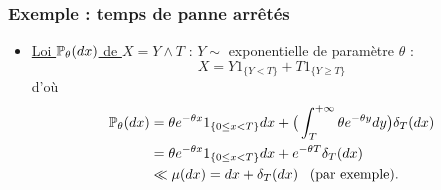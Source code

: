 %
%
%
\begin{frame}
\frametitle{Exemple : temps de panne \og arrêtés\fg{}}
\begin{itemize}
\item \underline{Loi $\operatorname{{\mathbb P}}_\theta(dx)$ de $X = Y \wedge T$} : $Y \sim$ exponentielle de paramètre $\theta$ :
$$\boxed{X = Y 1_{\{Y < T\}} + T 1_{\{Y \geq T\}}}$$
d'où
\begin{align*}\operatorname{{\mathbb P}}_\theta(dx) &
= \theta e^{-\theta x} 1_{\{0 \leq x < T\}} dx+ \big(\int_{T}^{+\infty}\theta e^{-\theta y}dy\big) \delta_T(dx)\\
&= \theta e^{-\theta x} 1_{\{0 \leq x < T\}}dx + e^{-\theta T} \delta_T(dx) \\
&\ll \mu(dx) = dx + \delta_T(dx)\;\;\; \text{(par exemple)}.
\end{align*}
\end{itemize}
\end{frame}


